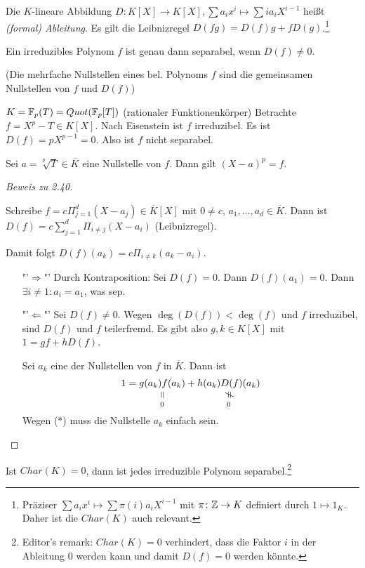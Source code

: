 \documentclass[../main.tex]{subfiles}
\begin{document}
\begin{definition}
    Die $K$-lineare Abbildung $D:K[X]\rightarrow K[X], \sum a_ix^i \mapsto \sum ia_iX^{i-1}$ heißt \emph{(formal) Ableitung}.
    Es gilt die Leibnizregel $D(fg) = D(f)g+fD(g)$.\footnote{Präziser $\sum a_ix^i \mapsto \sum \pi(i)a_iX^{i-1}$ mit $\pi\colon \mathbb{Z}\rightarrow K$ definiert durch $1\mapsto 1_K$. Daher ist die $Char(K)$ auch relevant.}
\end{definition}
\begin{theorem}
    Ein irreduzibles Polynom $f$ ist genau dann separabel, wenn $D(f)\neq 0$.
\end{theorem}
(Die mehrfache Nullstellen eines bel. Polynoms $f$ sind die gemeinsamen Nullstellen von $f$ und $D(f)$)
\begin{example}
    $K = \mathbb{F}_p(T) = Quot(\mathbb{F}_p[T])$ (rationaler Funktionenkörper)
    Betrachte $f=X^p-T\in K[X]$.
    Nach Eisenstein ist $f$ irreduzibel.
    Es ist $D(f)=pX^{p-1} = 0$.
    Also ist $f$ nicht separabel.
    
    Sei $a=\sqrt[p]{T}\in \overline{K}$ eine Nullstelle von $f$.
    Dann gilt $(X-a)^p =f$.
\end{example}
\begin{proof}[Beweis zu 2.40]
    \begin{remark*}
        Schreibe $f=c\Pi_{j=1}^d (X-a_j)\in \overline{K}[X]$ mit $0\neq c$, $a_1,\dots, a_d\in \overline{K}$.
        Dann ist $D(f) = c\sum_{j=1}^d \Pi_{i\neq j} (X-a_i)$ (Leibnizregel).
    \end{remark*}
    Damit folgt $D(f)(a_k)=c\Pi_{i\neq k} (a_k-a_i)$.

    \begin{itemize}
        \item["'$\Rightarrow$"'] Durch Kontraposition: Sei $D(f)=0$. Dann $D(f)(a_1)=0$. Dann $\exists i\neq1: a_i=a_1$, was \Lightning sep.
        \item["'$\Leftarrow$"'] Sei $D(f)\neq 0$.
        Wegen $\deg(D(f)) < \deg(f)$ und $f$ irreduzibel, sind $D(f)$ und $f$ teilerfremd.
        Es gibt also $g,k\in K[X]$ mit $1=gf+hD(f)$.
    
        Sei $a_k$ eine der Nullstellen von $f$ in $\overline{K}$. Dann ist
        $$1=\equalto{g(a_k) f(a_k)}{0} + \notequalto{h(a_k) D(f)(a_k)}{ 0}$$
        Wegen (*) muss die Nullstelle $a_k$ einfach sein.
    \end{itemize}
\end{proof}

\begin{remark}
    Ist $Char(K)=0$, dann ist jedes irreduzible Polynom separabel.\footnote{Editor's remark: $Char(K)=0$ verhindert, dass die Faktor $i$ in der Ableitung $0$ werden kann und damit $D(f)=0$ werden könnte.}
\end{remark}
\end{document}
